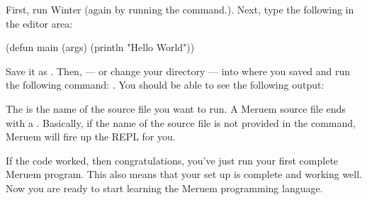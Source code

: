 First, run Winter (again by running the  command.). Next, type the following in the editor area:

\begin{Meruem}
(defun main (args) (println "Hello World"))
\end{Meruem}

Save it as . Then,  --- or change your directory --- into where you saved  and run the following command: . You should be able to see the following output:


The  is the name of the source file you want to run. A Meruem source file ends with a . Basically, if the name of the source file is not provided in the command, Meruem will fire up the REPL for you. 

If the code worked, then congratulations, you've just run your first complete Meruem program. This also means that your set up is complete and working well. Now you are ready to start learning the Meruem programming language.